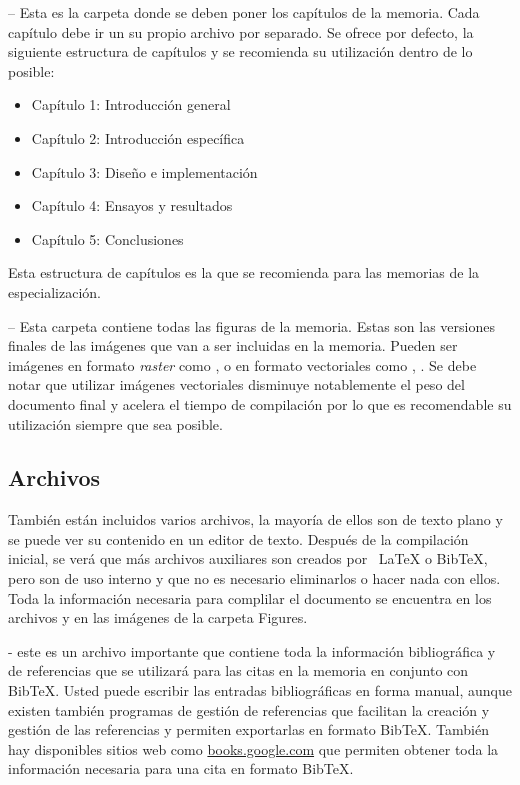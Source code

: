  -- Esta es la carpeta donde se deben poner los capítulos de la memoria. Cada capítulo debe ir un su propio archivo  por separado.  Se ofrece por defecto, la siguiente estructura de capítulos y se recomienda su utilización dentro de lo posible:
\begin{itemize}
\item Capítulo 1: Introducción general	
\item Capítulo 2: Introducción específica
\item Capítulo 3: Diseño e implementación
\item Capítulo 4: Ensayos y resultados
\item Capítulo 5: Conclusiones

\end{itemize}

Esta estructura de capítulos es la que se recomienda para las memorias de la especialización.

 -- Esta carpeta contiene todas las figuras de la memoria.  Estas son las versiones finales de las imágenes que van a ser incluidas en la memoria.  Pueden ser imágenes en formato \textit{raster} como ,  o en formato vectoriales como , .  Se debe notar que utilizar imágenes vectoriales disminuye notablemente el peso del documento final y acelera el tiempo de compilación por lo que es recomendable su utilización siempre que sea posible.

\subsection{Archivos}

También están incluidos varios archivos, la mayoría de ellos son de texto plano y se puede ver su contenido en un editor de texto. Después de la compilación inicial, se verá que más archivos auxiliares son creados por \ LaTeX{} o BibTeX, pero son de uso interno y que no es necesario eliminarlos o hacer nada con ellos.  Toda la información necesaria para complilar el documento se encuentra en los archivos  y en las imágenes de la carpeta Figures.

 - este es un archivo importante que contiene toda la información bibliográfica y de referencias que se utilizará para las citas en la memoria en conjunto con BibTeX. Usted puede escribir las entradas bibliográficas en forma manual, aunque existen también programas de gestión de referencias que facilitan la creación y gestión de las referencias y permiten exportarlas en formato BibTeX.  También hay disponibles sitios web como \url{books.google.com} que permiten obtener toda la información necesaria para una cita en formato BibTeX.

